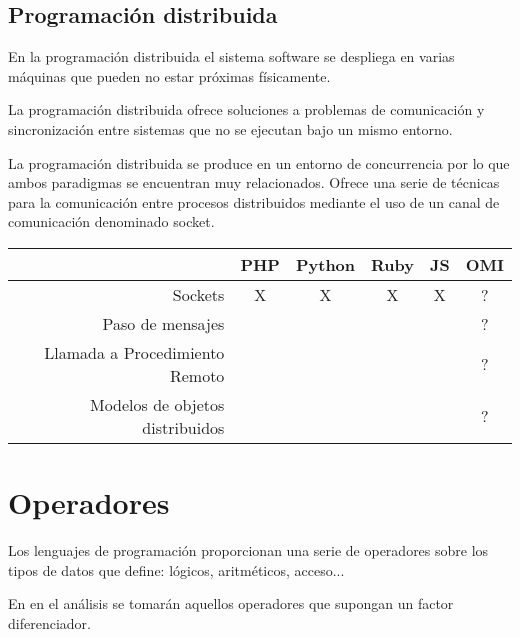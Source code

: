 \subsection{Programación distribuida}
En la programación distribuida el sistema software se despliega 
en varias máquinas que pueden no estar próximas físicamente.  

La programación distribuida ofrece soluciones a problemas de 
comunicación y sincronización entre sistemas que no se
ejecutan bajo un mismo entorno. 

La programación distribuida se produce en un entorno de concurrencia por lo
que ambos paradigmas se encuentran muy relacionados. Ofrece una serie de técnicas para la comunicación entre procesos distribuidos mediante el uso de un canal de comunicación 
denominado socket. 

\FloatBarrier
\begin{table}[h]
\begin{center}
 
\begin{tabular}{|r|c|c|c|c|c|} \hline
 & PHP  & Python & Ruby & JS & OMI\\ \hline
Sockets & X & X & X  & X & ? \\ \hline
Paso de mensajes &  &  &  &  & ? \\ \hline
Llamada a Procedimiento Remoto &  &  &  &  & ? \\ \hline
Modelos de objetos distribuidos &  &  &  &  & ? \\ \hline
\end{tabular}
\end{center}
\end{table}
\FloatBarrier

\section{Operadores}
Los lenguajes de programación proporcionan una serie de operadores sobre los
tipos de datos que define: lógicos, aritméticos, acceso...

En en el análisis se tomarán aquellos operadores que supongan un factor 
diferenciador.

